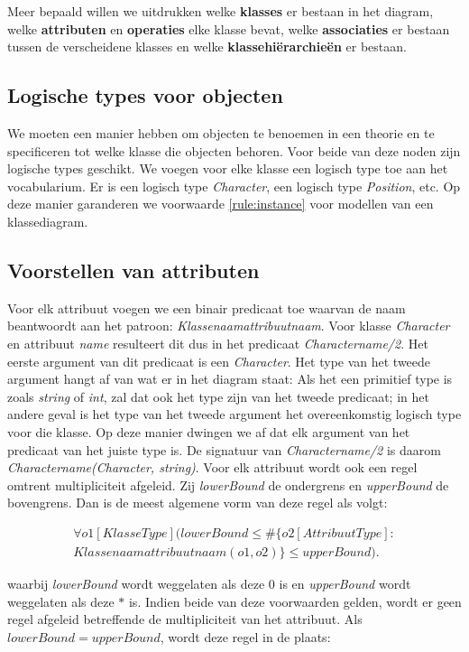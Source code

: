 Meer bepaald willen we uitdrukken welke \textbf{klasses} er bestaan in het diagram, welke \textbf{attributen} en \textbf{operaties} elke klasse bevat, welke \textbf{associaties} er bestaan tussen de verscheidene klasses en welke \textbf{klassehi\"erarchie\"en} er bestaan.

\subsection{Logische types voor objecten}
We moeten een manier hebben om objecten te benoemen in een theorie en te specificeren tot welke klasse die objecten behoren. Voor beide van deze noden zijn logische types geschikt. We voegen voor elke klasse een logisch type toe aan het vocabularium. Er is een logisch type \textit{Character}, een logisch type \textit{Position}, etc. Op deze manier garanderen we voorwaarde \ref{rule:instance} voor modellen van een klassediagram.

\subsection{Voorstellen van attributen}
Voor elk attribuut voegen we een binair predicaat toe waarvan de naam beantwoordt aan het patroon: \textit{Klassenaamattribuutnaam}. Voor klasse \textit{Character} en attribuut \textit{name} resulteert dit dus in het predicaat \textit{Charactername/2}. Het eerste argument van dit predicaat is een \textit{Character}. Het type van het tweede argument hangt af van wat er in het diagram staat: Als het een primitief type is zoals \textit{string} of \textit{int}, zal dat ook het type zijn van het tweede predicaat; in het andere geval is het type van het tweede argument het overeenkomstig logisch type voor die klasse. Op deze manier dwingen we af dat elk argument van het predicaat van het juiste type is.
De signatuur van \textit{Charactername/2} is daarom \textit{Charactername(Character, string)}.
Voor elk attribuut wordt ook een regel omtrent multipliciteit afgeleid. Zij \textit{lowerBound} de ondergrens en \textit{upperBound} de bovengrens. Dan is de meest algemene vorm van deze regel als volgt:
	
\begin{align*}
	\forall{o1}[KlasseType](lowerBound \leq \#\{o2 [AttribuutType] : \\ Klassenaamattribuutnaam(o1,o2)\} \leq upperBound).
\end{align*}
	
waarbij \textit{lowerBound} wordt weggelaten als deze $0$ is en \textit{upperBound} wordt weggelaten als deze $*$ is. Indien beide van deze voorwaarden gelden, wordt er geen regel afgeleid betreffende de multipliciteit van het attribuut. Als $lowerBound = upperBound$, wordt deze regel in de plaats:
	
